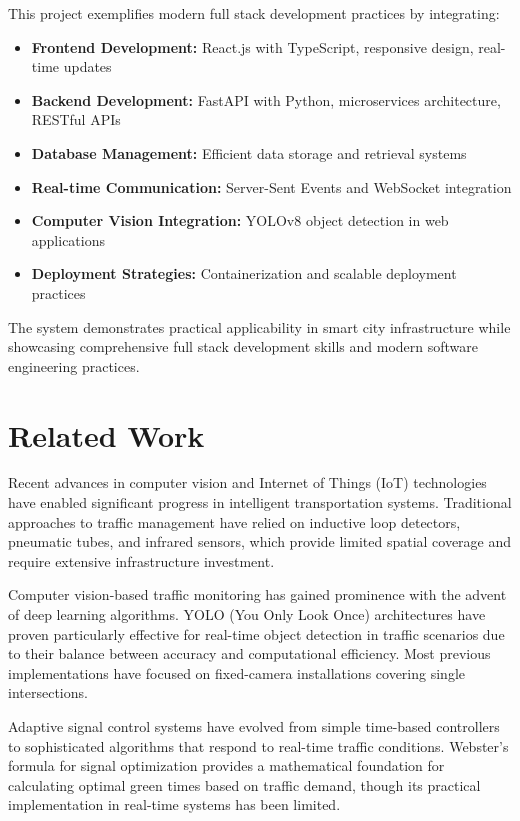 \documentclass[conference]{IEEEtran}
\begin{document}
This project exemplifies modern full stack development practices by integrating:
\begin{itemize}
\item \textbf{Frontend Development:} React.js with TypeScript, responsive design, real-time updates
\item \textbf{Backend Development:} FastAPI with Python, microservices architecture, RESTful APIs
\item \textbf{Database Management:} Efficient data storage and retrieval systems
\item \textbf{Real-time Communication:} Server-Sent Events and WebSocket integration
\item \textbf{Computer Vision Integration:} YOLOv8 object detection in web applications
\item \textbf{Deployment Strategies:} Containerization and scalable deployment practices
\end{itemize}

The system demonstrates practical applicability in smart city infrastructure while showcasing comprehensive full stack development skills and modern software engineering practices.

\section{Related Work}

Recent advances in computer vision and Internet of Things (IoT) technologies have enabled significant progress in intelligent transportation systems. Traditional approaches to traffic management have relied on inductive loop detectors, pneumatic tubes, and infrared sensors, which provide limited spatial coverage and require extensive infrastructure investment.

Computer vision-based traffic monitoring has gained prominence with the advent of deep learning algorithms. YOLO (You Only Look Once) architectures have proven particularly effective for real-time object detection in traffic scenarios due to their balance between accuracy and computational efficiency. Most previous implementations have focused on fixed-camera installations covering single intersections.

Adaptive signal control systems have evolved from simple time-based controllers to sophisticated algorithms that respond to real-time traffic conditions. Webster's formula for signal optimization provides a mathematical foundation for calculating optimal green times based on traffic demand, though its practical implementation in real-time systems has been limited.
\end{document}

